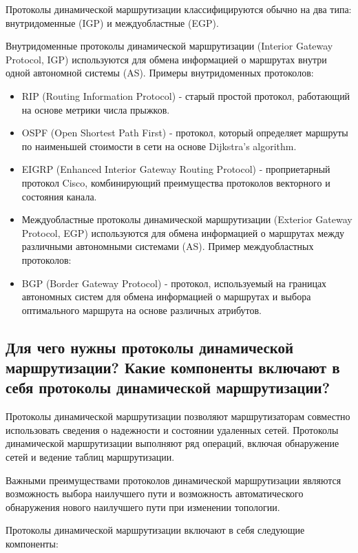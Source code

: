 Протоколы динамической маршрутизации классифицируются обычно 
на два типа: внутридоменные (IGP) и междуобластные (EGP).\par
Внутридоменные протоколы динамической маршрутизации (Interior 
Gateway Protocol, IGP) используются для обмена информацией о 
маршрутах внутри одной автономной системы (AS). Примеры 
внутридоменных протоколов:

\begin{itemize}
	\item RIP (Routing Information Protocol) - старый простой протокол, 
		работающий на основе метрики числа прыжков.
	\item OSPF (Open Shortest Path First) - протокол, который определяет 
		маршруты по наименьшей стоимости в сети на основе Dijkstra's 
		algorithm.
	\item EIGRP (Enhanced Interior Gateway Routing Protocol) - 
		проприетарный протокол Cisco, комбинирующий преимущества 
		протоколов векторного и состояния канала.
	\item Междуобластные протоколы динамической маршрутизации (Exterior 
		Gateway Protocol, EGP) используются для обмена информацией о 
		маршрутах между различными автономными системами (AS). Пример 
		междуобластных протоколов:
	\item BGP (Border Gateway Protocol) - протокол, используемый на 
		границах автономных систем для обмена информацией о 
		маршрутах и выбора оптимального маршрута на основе различных 
		атрибутов.
\end{itemize}

\subsection{Для чего нужны протоколы динамической маршрутизации? 
Какие компоненты включают в себя протоколы динамической 
маршрутизации?}

Протоколы динамической маршрутизации позволяют 
маршрутизаторам совместно использовать сведения о надежности и 
состоянии удаленных сетей. Протоколы динамической маршрутизации 
выполняют ряд операций, включая обнаружение сетей и ведение таблиц 
маршрутизации.\par
Важными преимуществами протоколов динамической маршрутизации 
являются возможность выбора наилучшего пути и возможность 
автоматического обнаружения нового наилучшего пути при изменении 
топологии.\par
Протоколы динамической маршрутизации включают в себя следующие 
компоненты:

